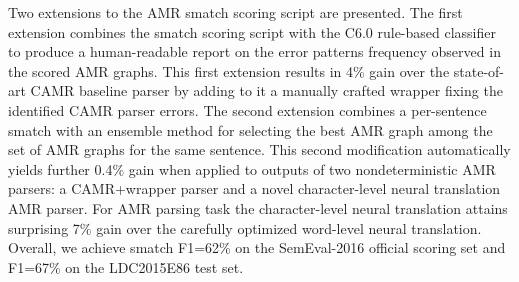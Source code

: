 Two extensions to the AMR smatch scoring script are presented. The first extension combines the smatch scoring script with the C6.0 rule-based classifier to produce a human-readable report on the error patterns frequency observed in the scored AMR graphs. This first extension results in 4\% gain over the state-of-art CAMR baseline parser by adding to it a manually crafted wrapper fixing the identified CAMR parser errors. The second extension combines a per-sentence smatch with an ensemble method for selecting the best AMR graph among the set of AMR graphs for the same sentence. This second modification automatically yields further 0.4\% gain when applied to outputs of two nondeterministic AMR parsers: a CAMR+wrapper parser and a novel character-level neural translation AMR parser. For AMR parsing task the character-level neural translation attains surprising 7\% gain over the carefully optimized word-level neural translation. Overall, we achieve smatch F1=62\% on the SemEval-2016 official scoring set and F1=67\% on the LDC2015E86 test set.
